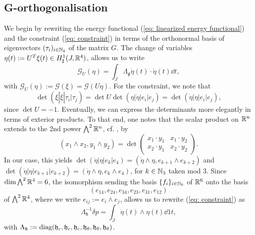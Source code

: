 \subsection{G-orthogonalisation}
We begin by rewriting the energy functional (\ref{eq: linearized energy functional}) and the constraint (\ref{eq: constraint}) in terms of the orthonormal basis of eigenvectors $(\tau_i)_{i \in \mathbb{N}_4}$ of the matrix $G$. The change of variables $\eta(t) := U^T \xi(t) \in H_{\sharp}^{1}(J, \mathbb{R}^4)$, allows us to write
\begin{equation}
\label{eq: G-orth energy functional}
\mathcal{G}_{U}(\eta) = \int_{J} \Lambda_{\mathfrak{g}} \dot{\eta}(t) \cdot \dot{\eta}(t) \dd t,
\end{equation}
with $\mathcal{G}_{U}(\eta) := \mathcal{G}(\xi) = \mathcal{G}(U \eta)$. For the constraint, we note that
\begin{equation}
\det(\xi |\dot{\xi} | \tau_i | \tau_j) =  \det U \det (\eta | \dot{\eta} | e_i | e_j) = \det(\dot{\eta} | \eta | e_i |e_j),
\end{equation}
since $\det U = -1$. Eventually, we can express the determinants more elegantly in terms of exterior products. To that end, one notes that the scalar product on $\mathbb{R}^n$ extends to the 2nd power $\bigwedge^2 \mathbb{R}^n$, cf. \cite{Lounesto2006}, by
\begin{equation}
(x_1 \wedge x_2, y_1 \wedge y_2) = \det \left (\begin{array}{cc}
x_1 \cdot y_1 & x_1 \cdot y_2 \\ 
x_2 \cdot y_1 & x_2 \cdot y_2
\end{array}  \right ).
\end{equation}
In our case, this yields $\det(\dot{\eta} | \eta | e_k |e_4) = (\dot{\eta} \wedge \eta, e_{k + 1} \wedge e_{k+2})$ and $\det(\dot{\eta} |\eta | e_{k + 1} |e_{k + 2}) = (\dot{\eta} \wedge \eta, e_k \wedge e_4)$, for $k \in \mathbb{N}_3$ taken mod 3. Since $\dim \bigwedge^2 \mathbb{R}^4 = 6$, the isomorphism sending the basis $\{f_i\}_{i \in \mathbb{N}_6}$ of $\mathbb{R}^6$ onto the basis 
\begin{equation}
\label{eq: basis of bivectors}
(e_{14}, e_{24}, e_{34}, e_{23}, e_{31}, e_{12})
\end{equation}
of $\bigwedge^2 \mathbb{R}^4$, where we write $e_{ij} := e_i \wedge e_j$, allows us to rewrite (\ref{eq: constraint}) as
\begin{equation}
\label{eq: G-orth constraint}
\Lambda_{\mathfrak{h}}^{-1} \delta p = \int_{J} \dot{\eta}(t) \wedge\eta(t) \dd 1t,
\end{equation}
with $\Lambda_{\mathfrak{h}} := \operatorname{diag}(\mathfrak{h}_{c}, \mathfrak{h}_{c}, \mathfrak{h}_{c}, \mathfrak{h}_{\theta}, \mathfrak{h}_{\theta}, \mathfrak{h}_{\theta})$.

